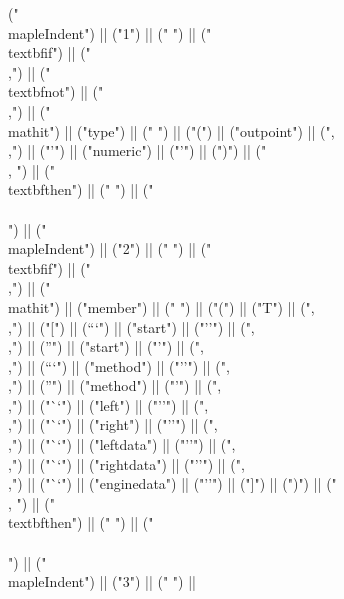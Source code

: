 \documentclass{article}
\begin{document}
\begin{center}
\begin{maplelatex}
{("\\mapleIndent{") || ("1") || ("} ") || ("\\textbf{if}") || (" \\,") || ("\\textbf{not}") || (" \\,") || ("\\mathit{") || ("type") || ("} ") || ("(") || ("outpoint") || (",\\,") || ("'") || ("numeric") || ("'") || (")") || (" \\, ") || ("\\textbf{then}") || (" ") || ("\\\\\n") || ("\\mapleIndent{") || ("2") || ("} ") || ("\\textbf{if}") || (" \\,") || ("\\mathit{") || ("member") || ("} ") || ("(") || ("T") || (",\\,") || ("[") || ("``") || ("start") || ("''") || (",\\,") || ("'") || ("start") || ("'") || (",\\,") || ("``") || ("method") || ("''") || (",\\,") || ("'") || ("method") || ("'") || (",\\,") || ("``") || ("left") || ("''") || (",\\,") || ("``") || ("right") || ("''") || (",\\,") || ("``") || ("leftdata") || ("''") || (",\\,") || ("``") || ("rightdata") || ("''") || (",\\,") || ("``") || ("enginedata") || ("''") || ("]") || (")") || (" \\, ") || ("\\textbf{then}") || (" ") || ("\\\\\n") || ("\\mapleIndent{") || ("3") || ("} ") || }
\end{maplelatex}
\end{center}
\end{document}
